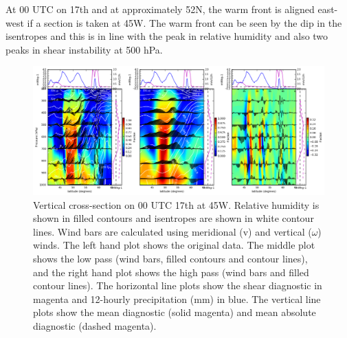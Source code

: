 
At 00 UTC on 17th and at approximately 52N, the warm front is aligned east-west if a section is taken at 45W. The warm front can be seen by the dip in the isentropes and this is in line with the peak in relative humidity and also two peaks in shear instability at 500 hPa.

\begin{figure}[h]	
	\includegraphics[width=40pc,angle=0]{cx3_sub_v_RH_pt_ens9_45W_00UTC_17th.png}
	\caption{Vertical cross-section on 00 UTC 17th at 45W. Relative humidity is shown in filled contours and isentropes are shown in white contour lines. Wind bars are calculated using meridional (v) and vertical ($\omega$) winds. The left hand plot shows the original data. The middle plot shows the low pass (wind bars, filled contours and contour lines), and the right hand plot shows the high pass (wind bars and filled contour lines). The horizontal line plots show the shear diagnostic in magenta and 12-hourly precipitation (mm) in blue. The vertical line plots show the mean diagnostic (solid magenta) and mean absolute diagnostic (dashed magenta).}\label{fig:HC_cxE}
	\centering
\end{figure}

%
%
%

